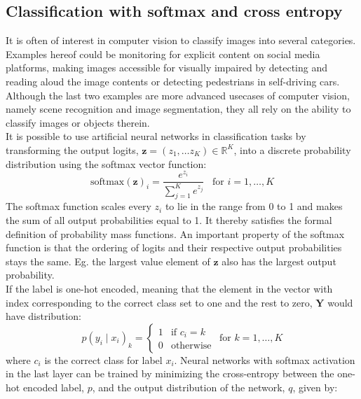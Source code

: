 \documentclass[a4paper,11pt]{article} %
\begin{document}
\subsection{Classification with softmax and cross entropy}
It is often of interest in computer vision to classify images into several categories. Examples hereof could be monitoring for explicit content on social media platforms, making images accessible for visually impaired by detecting and reading aloud the image contents or detecting pedestrians in self-driving cars. Although the last two examples are more advanced usecases of computer vision, namely scene recognition and image segmentation, they all rely on the ability to classify images or objects therein. \\
It is possible to use artificial neural networks in classification tasks by transforming the output logits, $\mathbf{z} = (z_1, \ldots z_K) \in \mathbb{R}^K$, into a discrete probability distribution using the softmax vector function:
\begin{equation} \label{eq:softmax}
  \text{softmax}(\mathbf{z})_i = \frac{e^{z_i}}{\sum_{j=1}^{K}{e^{z_j}}} \hspace{10pt} \text{for } i = 1,\ldots,K 
\end{equation}
The softmax function scales every $z_i$ to lie in the range from 0 to 1 and makes the sum of all output probabilities equal to 1. It thereby satisfies the formal definition of probability mass functions. An important property of the softmax function is that the ordering of logits and their respective output probabilities stays the same. Eg. the largest value element of $\mathbf{z}$ also has the largest output probability. \\
If the label is one-hot encoded, meaning that the element in the vector with index corresponding to the correct class set to one and the rest to zero, $\mathbf{Y}$ would have distribution:
\begin{equation}
  p(y_i \mid x_i)_k = \begin{cases}
    1 & \text{if } c_{i} = k \\
    0 & \text{otherwise}
  \end{cases} \hspace{5pt} \text{for } k = 1, \ldots, K
\end{equation}
where $c_i$ is the correct class for label $x_i$. Neural networks with softmax activation in the last layer can be trained by minimizing the cross-entropy between the one-hot encoded label, $p$, and the output distribution of the network, $q$, given by:
\end{document}
